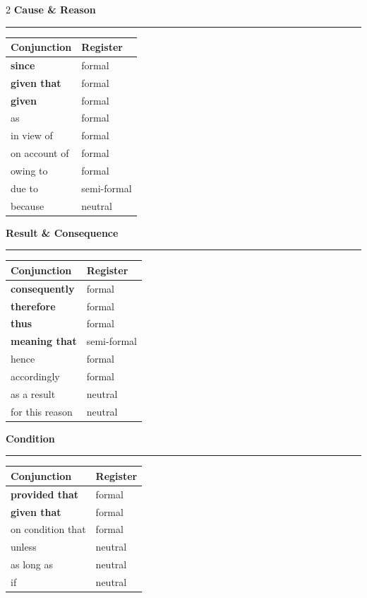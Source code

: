 \documentclass[11pt,a4paper]{article}
\newcommand{\sectionheading}[1]{%
  \vspace{6pt}%
  {\color{konstanzblue}\large\textbf{#1}}\\[-4pt]%
  {\color{konstanzblue}\rule{\linewidth}{1.5pt}}%
  \vspace{2pt}%
}
\begin{document}
\begin{multicols}{2}
\vspace{10pt}
\sectionheading{Cause \& Reason}
\begin{tabular}{@{}ll@{}}
\toprule
\textbf{Conjunction} & \textbf{Register} \\
\midrule
\textbf{since} & formal \\
\textbf{given that} & formal \\
\textbf{given} & formal \\
as & formal \\
in view of & formal \\
on account of & formal \\
owing to & formal \\
due to & semi-formal \\
because & neutral \\
\bottomrule
\end{tabular}

\vspace{10pt}
\sectionheading{Result \& Consequence}
\begin{tabular}{@{}ll@{}}
\toprule
\textbf{Conjunction} & \textbf{Register} \\
\midrule
\textbf{consequently} & formal \\
\textbf{therefore} & formal \\
\textbf{thus} & formal \\
\textbf{meaning that} & semi-formal \\
hence & formal \\
accordingly & formal \\
as a result & neutral \\
for this reason & neutral \\
\bottomrule
\end{tabular}

\columnbreak

\sectionheading{Condition}
\begin{tabular}{@{}ll@{}}
\toprule
\textbf{Conjunction} & \textbf{Register} \\
\midrule
\textbf{provided that} & formal \\
\textbf{given that} & formal \\
on condition that & formal \\
unless & neutral \\
as long as & neutral \\
if & neutral \\
\bottomrule
\end{tabular}


\end{multicols}
\end{document}
